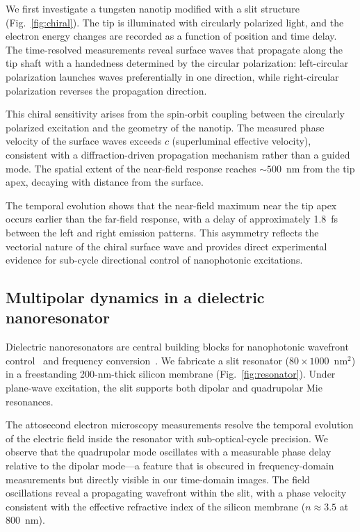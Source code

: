\documentclass[12pt]{article}
\begin{document}
We first investigate a tungsten nanotip modified with a slit structure (Fig.~\ref{fig:chiral}). The tip is illuminated with circularly polarized light, and the electron energy changes are recorded as a function of position and time delay. The time-resolved measurements reveal surface waves that propagate along the tip shaft with a handedness determined by the circular polarization: left-circular polarization launches waves preferentially in one direction, while right-circular polarization reverses the propagation direction.

This chiral sensitivity arises from the spin-orbit coupling between the circularly polarized excitation and the geometry of the nanotip. The measured phase velocity of the surface waves exceeds $c$ (superluminal effective velocity), consistent with a diffraction-driven propagation mechanism rather than a guided mode. The spatial extent of the near-field response reaches ${\sim}500$~nm from the tip apex, decaying with distance from the surface.

The temporal evolution shows that the near-field maximum near the tip apex occurs earlier than the far-field response, with a delay of approximately 1.8~fs between the left and right emission patterns. This asymmetry reflects the vectorial nature of the chiral surface wave and provides direct experimental evidence for sub-cycle directional control of nanophotonic excitations.

\subsection{Multipolar dynamics in a dielectric nanoresonator}

Dielectric nanoresonators are central building blocks for nanophotonic wavefront control~\cite{Khorasaninejad2017,Kamali2018,Krausz2009} and frequency conversion~\cite{Li2020_nl}. We fabricate a slit resonator ($80 \times 1000$~nm$^2$) in a freestanding 200-nm-thick silicon membrane (Fig.~\ref{fig:resonator}). Under plane-wave excitation, the slit supports both dipolar and quadrupolar Mie resonances.

The attosecond electron microscopy measurements resolve the temporal evolution of the electric field inside the resonator with sub-optical-cycle precision. We observe that the quadrupolar mode oscillates with a measurable phase delay relative to the dipolar mode---a feature that is obscured in frequency-domain measurements but directly visible in our time-domain images. The field oscillations reveal a propagating wavefront within the slit, with a phase velocity consistent with the effective refractive index of the silicon membrane ($n \approx 3.5$ at 800~nm).
\end{document}
